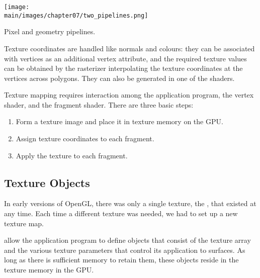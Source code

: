 \documentclass[../COS3712_Notes.tex]{subfiles}
\begin{document}
      \begin{center}
        \captionsetup{type=figure}
        \vspace{0.5cm}
        \texttt{[image: \\main/images/chapter07/two\_pipelines.png]}
        \caption{Pixel and geometry pipelines.}
        \vspace{0.5cm}
      \end{center}

      Texture coordinates are handled like normals and colours:
      they can be associated with vertices as an additional vertex attribute,
      and the required texture values can be obtained by the rasterizer interpolating
      the texture coordinates at the vertices across polygons.
      They can also be generated in one of the shaders.

      Texture mapping requires interaction among the application program, the vertex shader,
      and the fragment shader.
      There are three basic steps:
      \begin{enumerate}[nosep]
        \item Form a texture image and place it in texture memory on the GPU.
        \item Assign texture coordinates to each fragment.
        \item Apply the texture to each fragment.
      \end{enumerate}

      \subsection{Texture Objects}
        In early versions of OpenGL, there was only a single texture,
        the , that existed at any time.
        Each time a different texture was needed, we had to set up a new texture map.

         allow the application program to define objects that consist
        of the texture array and the various texture parameters that control its application
        to surfaces.
        As long as there is sufficient memory to retain them, these objects reside in the
        texture memory in the GPU.
\end{document}
